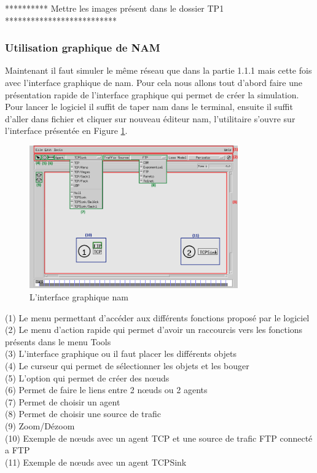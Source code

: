 \documentclass[11pt]{article}
\begin{document}
********** Mettre les images présent dans le dossier TP1 **************************

\subsubsection{Utilisation graphique de NAM}

Maintenant il faut simuler le même réseau que dans la partie 1.1.1 mais cette fois avec l’interface graphique de nam. Pour cela nous allons tout d'abord faire une présentation rapide de l'interface graphique qui permet de créer la simulation. Pour lancer le logiciel il suffit de taper nam dans le terminal, ensuite il suffit d'aller dans fichier et cliquer sur nouveau éditeur nam,  l'utilitaire s'ouvre sur l'interface présentée en Figure \ref{namExplcation}.

\begin{figure}[H]
	\begin{center}
		\includegraphics[width=0.8\textwidth]{assets/tp1/explicationNam.png}
	\end{center}
	\caption{L'interface graphique nam}
	\label{namExplcation}
\end{figure}

\noindent
(1) Le menu permettant d’accéder aux différents fonctions proposé par le logiciel\\
(2) Le menu d'action rapide qui permet d'avoir un raccourcis vers les fonctions présents dans le menu Tools\\
(3) L'interface graphique ou il faut placer les différents objets \\
(4) Le  curseur qui permet de sélectionner les objets et les bouger\\
(5) L'option qui permet de créer des nœuds\\
(6) Permet de faire le liens entre 2 nœuds ou 2 agents\\
(7) Permet de choisir un agent\\
(8) Permet de choisir une source de trafic \\
(9) Zoom/Dézoom\\
(10) Exemple de nœuds avec un agent TCP et une source de trafic FTP connecté a FTP\\
(11) Exemple de nœuds avec un agent TCPSink\\
\end{document}
